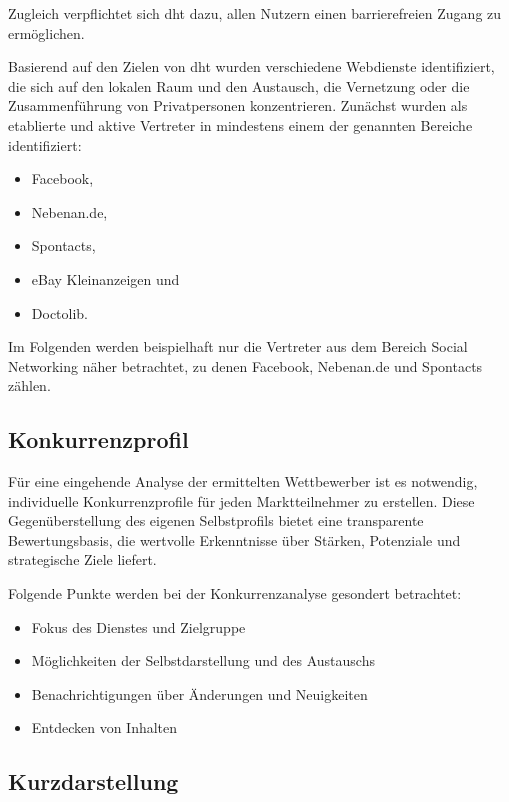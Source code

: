 Zugleich verpflichtet sich \acrshort{dht} dazu, allen Nutzern einen barrierefreien Zugang zu ermöglichen.

Basierend auf den Zielen von \acrshort{dht} wurden verschiedene Webdienste identifiziert, die sich auf den lokalen Raum und den Austausch, die Vernetzung oder die Zusammenführung von Privatpersonen konzentrieren. Zunächst wurden als etablierte und aktive Vertreter in mindestens einem der genannten Bereiche identifiziert:

\begin{itemize}
    \item Facebook,
    \item Nebenan.de,
    \item Spontacts,
    \item eBay Kleinanzeigen und
    \item Doctolib.
\end{itemize}

Im Folgenden werden beispielhaft nur die Vertreter aus dem Bereich Social Networking näher betrachtet, zu denen Facebook, Nebenan.de und Spontacts zählen.

\subsection{Konkurrenzprofil}

Für eine eingehende Analyse der ermittelten Wettbewerber ist es notwendig, individuelle Konkurrenzprofile für jeden Marktteilnehmer zu erstellen. Diese Gegenüberstellung des eigenen Selbstprofils bietet eine transparente Bewertungsbasis, die wertvolle Erkenntnisse über Stärken, Potenziale und strategische Ziele liefert.

Folgende Punkte werden bei der Konkurrenzanalyse gesondert betrachtet:

\begin{itemize}
    \item Fokus des Dienstes und Zielgruppe
    \item Möglichkeiten der Selbstdarstellung und des Austauschs
    \item Benachrichtigungen über Änderungen und Neuigkeiten
    \item Entdecken von Inhalten
\end{itemize}

\subsection{Kurzdarstellung}

